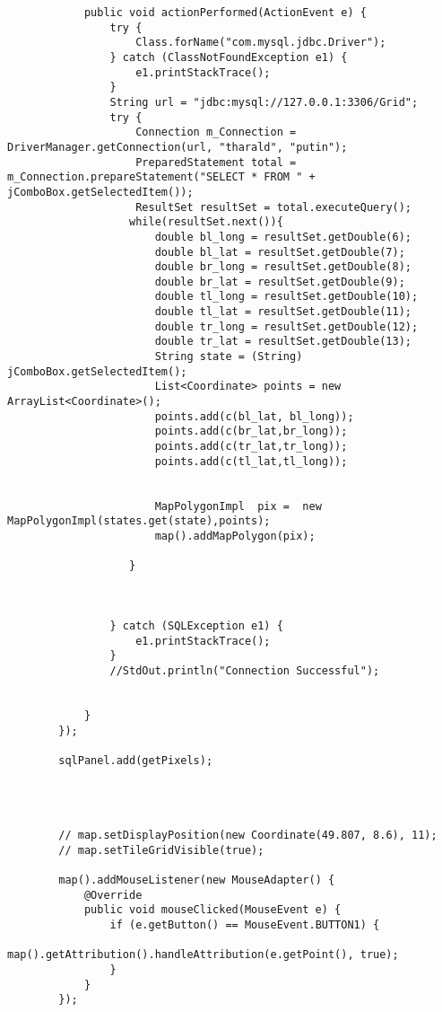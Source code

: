 \begin{verbatim}
            public void actionPerformed(ActionEvent e) {
                try {
                    Class.forName("com.mysql.jdbc.Driver");
                } catch (ClassNotFoundException e1) {
                    e1.printStackTrace();
                }
                String url = "jdbc:mysql://127.0.0.1:3306/Grid";
                try {
                    Connection m_Connection = DriverManager.getConnection(url, "tharald", "putin");
                    PreparedStatement total = m_Connection.prepareStatement("SELECT * FROM " + jComboBox.getSelectedItem());
                    ResultSet resultSet = total.executeQuery();
                   while(resultSet.next()){
                       double bl_long = resultSet.getDouble(6);
                       double bl_lat = resultSet.getDouble(7);
                       double br_long = resultSet.getDouble(8);
                       double br_lat = resultSet.getDouble(9);
                       double tl_long = resultSet.getDouble(10);
                       double tl_lat = resultSet.getDouble(11);
                       double tr_long = resultSet.getDouble(12);
                       double tr_lat = resultSet.getDouble(13);
                       String state = (String) jComboBox.getSelectedItem();
                       List<Coordinate> points = new ArrayList<Coordinate>();
                       points.add(c(bl_lat, bl_long));
                       points.add(c(br_lat,br_long));
                       points.add(c(tr_lat,tr_long));
                       points.add(c(tl_lat,tl_long));


                       MapPolygonImpl  pix =  new MapPolygonImpl(states.get(state),points);
                       map().addMapPolygon(pix);

                   }



                } catch (SQLException e1) {
                    e1.printStackTrace();
                }
                //StdOut.println("Connection Successful");


            }
        });

        sqlPanel.add(getPixels);




        // map.setDisplayPosition(new Coordinate(49.807, 8.6), 11);
        // map.setTileGridVisible(true);

        map().addMouseListener(new MouseAdapter() {
            @Override
            public void mouseClicked(MouseEvent e) {
                if (e.getButton() == MouseEvent.BUTTON1) {
                    map().getAttribution().handleAttribution(e.getPoint(), true);
                }
            }
        });


\end{verbatim}
